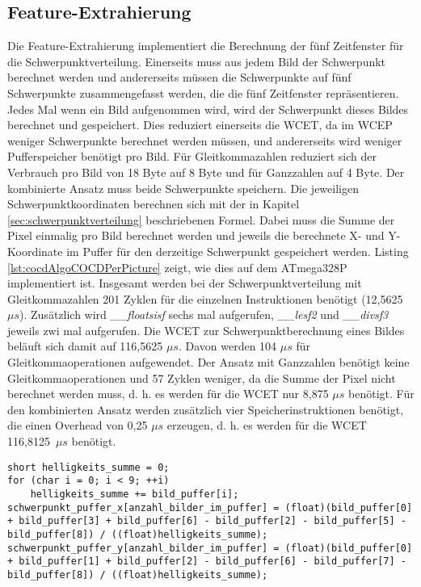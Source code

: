 \subsection{Feature-Extrahierung}
Die Feature-Extrahierung implementiert die Berechnung der fünf Zeitfenster für die Schwerpunktverteilung. Einerseits muss aus jedem Bild der Schwerpunkt berechnet werden und andererseits müssen die Schwerpunkte
auf fünf Schwerpunkte zusammengefasst werden, die die fünf Zeitfenster repräsentieren.
\newline
\newline
Jedes Mal wenn ein Bild aufgenommen wird, wird der Schwerpunkt dieses Bildes berechnet und gespeichert. Dies reduziert einerseits die WCET, da im WCEP weniger Schwerpunkte berechnet werden müssen, und andererseits
wird weniger Pufferspeicher benötigt pro Bild. Für Gleitkommazahlen reduziert sich der Verbrauch pro Bild von 18 Byte auf 8 Byte und für Ganzzahlen auf 4 Byte. Der kombinierte Ansatz muss beide Schwerpunkte speichern.
Die jeweiligen Schwerpunktkoordinaten berechnen sich mit der in Kapitel \ref{sec:schwerpunktverteilung} beschriebenen Formel. Dabei muss die Summe der Pixel einmalig pro Bild berechnet werden und jeweils die
berechnete X- und Y-Koordinate im Puffer für den derzeitige Schwerpunkt gespeichert werden. Listing \ref{lst:cocdAlgoCOCDPerPicture} zeigt, wie dies auf dem ATmega328P implementiert ist. Insgesamt werden bei der
Schwerpunktverteilung mit Gleitkommazahlen 201 Zyklen für die einzelnen Instruktionen benötigt (12,5625 $\mu s$). Zusätzlich wird \textit{\_\_floatsisf} sechs mal aufgerufen, \textit{\_\_lesf2} und \textit{\_\_divsf3}
jeweils zwi mal aufgerufen. Die WCET zur Schwerpunktberechnung eines Bildes beläuft sich damit auf 116,5625 $\mu s$. Davon werden 104 $\mu s$ für Gleitkommaoperationen aufgewendet. Der Ansatz mit Ganzzahlen benötigt
keine Gleitkommaoperationen und 57 Zyklen weniger, da die Summe der Pixel nicht berechnet werden muss, d. h. es werden für die WCET nur 8,875 $\mu s$ benötigt. Für den kombinierten Ansatz werden zusätzlich vier
Speicherinstruktionen benötigt, die einen Overhead von 0,25 $\mu s$ erzeugen, d. h. es werden für die WCET 116,8125~$\mu s$ benötigt.
\begin{lstlisting}[label=lst:cocdAlgoCOCDPerPicture,caption={Implementierung um den Schwerpunkt für ein Bild zu berechnen.}]
short helligkeits_summe = 0;
for (char i = 0; i < 9; ++i)
    helligkeits_summe += bild_puffer[i];
schwerpunkt_puffer_x[anzahl_bilder_im_puffer] = (float)(bild_puffer[0] + bild_puffer[3] + bild_puffer[6] - bild_puffer[2] - bild_puffer[5] - bild_puffer[8]) / ((float)helligkeits_summe);
schwerpunkt_puffer_y[anzahl_bilder_im_puffer] = (float)(bild_puffer[0] + bild_puffer[1] + bild_puffer[2] - bild_puffer[6] - bild_puffer[7] - bild_puffer[8]) / ((float)helligkeits_summe);
\end{lstlisting}
